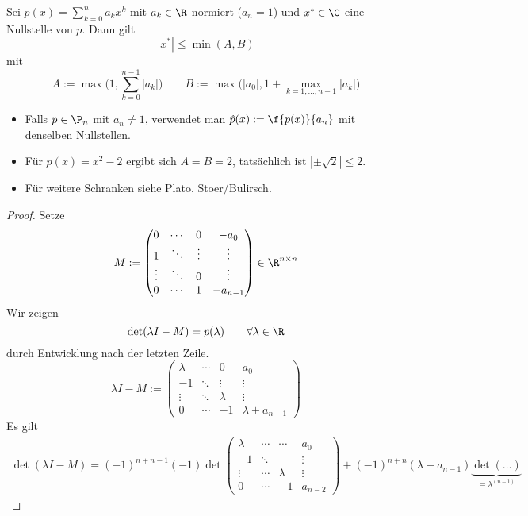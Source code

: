 \documentclass[11pt]{scrbook}
\begin{document}
\begin{st} \label{3.9}
	Sei $p(x) = \sum_{k=0}^n a_k x^k$ mit $a_k \in \R$ normiert ($a_n = 1$) und $x^* \in \C$ eine Nullstelle von $p$.
	Dann gilt
	\[
		|x^*| \le \min(A,B)
	\]
	mit
	\[
		A := \max\bigg(1, \sum_{k=0}^{n-1} |a_k| \bigg) \qquad
		B := \max\bigg(|a_0|, 1+\max_{k=1,\dotsc,n-1} |a_k|\bigg)
	\]
	\begin{note}
		\begin{itemize}
			\item
				Falls $p\in \P_n$ mit $a_n \neq 1$, verwendet man $\hat p(x) := \f {p(x)}{a_n}$ mit denselben Nullstellen.
			\item
				Für $p(x) = x^2-2$ ergibt sich $A=B=2$, tatsächlich ist $|\pm \sqrt2| \le 2$.
			\item
				Für weitere Schranken siehe Plato, Stoer/Bulirsch.
		\end{itemize}
	\end{note}
	\begin{proof}
		Setze
		\[
			M := \begin{pmatrix}
				0 & \cdots & 0 & -a_0 \\
				1 & \ddots & \vdots & \vdots \\
				\vdots & \ddots & 0 & \vdots \\
				0 & \cdots & 1 & -a_{n-1}
			\end{pmatrix}
			\in \R^{n\times n}
		\]
		Wir zeigen
		\[
			\det(\lambda I - M) = p(\lambda) \qquad \forall \lambda \in \R
		\]
		durch Entwicklung nach der letzten Zeile.
		\[
			\lambda I - M := \begin{pmatrix}
				\lambda & \cdots & 0 & a_0 \\
				-1 & \ddots & \vdots & \vdots \\
				\vdots & \ddots & \lambda & \vdots \\
				0 & \cdots & -1 & \lambda + a_{n-1}
			\end{pmatrix}
		\]
		Es gilt
		\begin{align*}
			\det(\lambda I - M) = (-1)^{n+n-1}(-1) \det \begin{pmatrix}
				\lambda & \cdots & \cdots & a_0 \\
				-1 & \ddots & & \vdots \\
				\vdots & \cdots & \lambda & \vdots \\
				0 & \cdots & -1 & a_{n-2}
			\end{pmatrix}
			 + (-1)^{n+n} (\lambda + a_{n-1}) \underbrace{\det (\dotsc)}_{=\lambda^{(n-1)}}
		\end{align*}

\end{proof}
\end{st}
\end{document}
